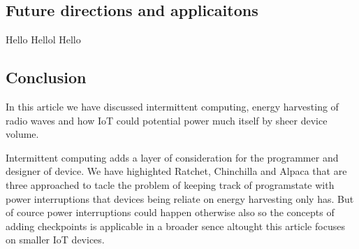 \documentclass[article,a4paper]{IEEEtran}
\begin{document}
\subsection{Future directions and applicaitons}
Hello Hellol Hello

\subsection{Conclusion}
In this article we have discussed intermittent computing, energy harvesting of radio waves and how IoT could potential power much itself by sheer device volume.

Intermittent computing adds a layer of consideration for the programmer and designer of device. We have highighted Ratchet, Chinchilla and Alpaca that are three approached to tacle the problem of keeping track of programstate with power interruptions that devices being reliate on energy harvesting only has. But of cource power interruptions could happen otherwise also so the concepts of adding checkpoints is applicable in a broader sence altought this article focuses on smaller IoT devices. 
\printbibliography
\end{document}
